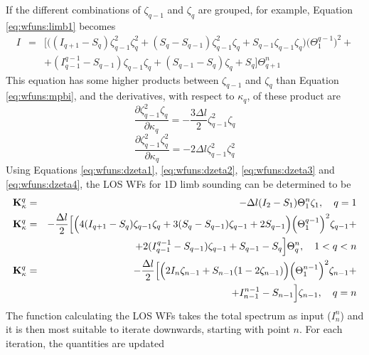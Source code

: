  If the different combinations of $\zeta_{q-1}$ and $\zeta_q$ are 
 grouped, for example, Equation \ref{eq:wfuns:limb1} becomes
 \begin{eqnarray}
   I & = & \Big[\Big((I_{q+1}-S_q)\zeta_{q-1}^2\zeta_q^2+(S_q-S_{q-1})
            \zeta_{q-1}^2\zeta_q + S_{q-1}\zeta_{q-1}\zeta_q
            \Big)\Big(\Theta^{q-1}_{1}\Big)^2 + \nonumber \\
    &  &     + (I_{q-1}^{q-1}-S_{q-1})\zeta_{q-1}\zeta_q + 
            (S_{q-1}-S_q)\zeta_q + S_q \Big] \Theta^n_{q+1} 
 \end{eqnarray}
 This equation has some higher products between
 $\zeta_{q-1}$ and $\zeta_q$ than Equation \ref{eq:wfuns:mpbi}, and
 the derivatives, with respect to $\kappa_q$, of these product are
 \begin{equation}
   \frac{\partial \zeta_{q-1}^2\zeta_q}{\partial \kappa_q} = 
         -\frac{3\Delta l}{2} \zeta_{q-1}^2\zeta_q
  \label{eq:wfuns:dzeta3}
 \end{equation}
 \begin{equation}
   \frac{\partial \zeta_{q-1}^2\zeta_q^2}{\partial \kappa_q} = 
          -2\Delta l \zeta_{q-1}^2\zeta_q^2
  \label{eq:wfuns:dzeta4}
 \end{equation}
 Using Equations \ref{eq:wfuns:dzeta1}, \ref{eq:wfuns:dzeta2},
 \ref{eq:wfuns:dzeta3} and \ref{eq:wfuns:dzeta4}, the LOS WFs for 1D
 limb sounding can be determined to be
 \begin{eqnarray}
   \mathbf{K}_{\kappa}^q& = & -\Delta l (I_2-S_1)\Theta^n_{1}\zeta_1, 
          \quad q=1 \nonumber \\
   \mathbf{K}_{\kappa}^q& = & -\frac{\Delta l}{2}\Big[\Big(4(I_{q+1}-S_q)
           \zeta_{q-1}\zeta_q+
            3(S_q-S_{q-1})\zeta_{q-1} + 2 S_{q-1}
            \Big) \Big(\Theta^{q-1}_{1}\Big)^2\zeta_{q-1} +  \nonumber \\
       &  & + 2(I_{q-1}^{q-1}-S_{q-1})\zeta_{q-1} + 
            S_{q-1}-S_q \Big] \Theta^n_{q}, \quad 1<q<n
  \label{eq:wfuns:loswfs2} \\
   \mathbf{K}_{\kappa}^q& = & -\frac{\Delta l}{2}\Big[\Big( 2I_n\zeta_{n-1}+
         S_{n-1}(1-2\zeta_{n-1}) \Big)\Big(\Theta^{n-1}_{1}\Big)^2\zeta_{n-1}+ 
             \nonumber \\   
       & &  + I_{n-1}^{n-1}-S_{n-1}\Big] \zeta_{n-1}, \quad q=n \nonumber
 \end{eqnarray}
 The function calculating the LOS WFs takes the total spectrum as input
 ($I_n^n$) and it is then most suitable to iterate downwards,
 starting with point $n$. For each iteration, the quantities are updated
